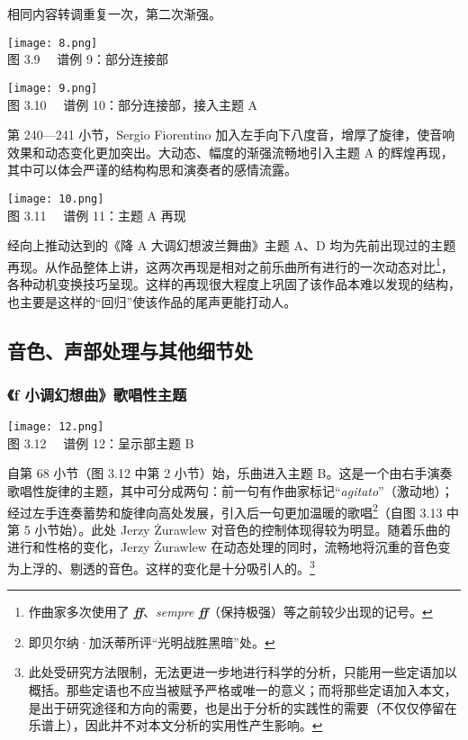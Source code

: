     相同内容转调重复一次，第二次渐强。

    \begin{center}
    \texttt{[image: 8.png]}\\
    \heiti \fontsize{10.5}{12.6}\selectfont 图 3.9 \ \ 谱例 9：部分连接部
    \end{center}
    \begin{center}
    \texttt{[image: 9.png]}\\
    \heiti \fontsize{10.5}{12.6}\selectfont 图 3.10 \ \ 谱例 10：部分连接部，接入主题 A
    \end{center}

    第 240—241 小节，Sergio Fiorentino 加入左手向下八度音，增厚了旋律，使音响效果和动态变化更加突出。大动态、幅度的渐强流畅地引入主题 A 的辉煌再现，其中可以体会严谨的结构构思和演奏者的感情流露。

    \begin{center}
    \texttt{[image: 10.png]}\\
    \heiti \fontsize{10.5}{12.6}\selectfont 图 3.11 \ \ 谱例 11：主题 A 再现
    \end{center}

    经向上推动达到的《降 A 大调幻想波兰舞曲》主题 A、D 均为先前出现过的主题再现。从作品整体上讲，这两次再现是相对之前乐曲所有进行的一次动态对比\footnote{作曲家多次使用了 \textit{\textbf{ff}}、\textit{sempre \textbf{ff}}（保持极强）等之前较少出现的记号。}，各种动机变换技巧呈现。这样的再现很大程度上巩固了该作品本难以发现的结构，也主要是这样的“回归”使该作品的尾声更能打动人。



    \subsection{\heiti \fontsize{15}{18}\selectfont 音色、声部处理与其他细节处}

    \subsubsection{\heiti \fontsize{14}{16.8}\selectfont 《f 小调幻想曲》歌唱性主题}

    \begin{center}
    \texttt{[image: 12.png]}\\
    \heiti \fontsize{10.5}{12.6}\selectfont 图 3.12 \ \ 谱例 12：呈示部主题 B
    \end{center}

    自第 68 小节（图 3.12 中第 2 小节）始，乐曲进入主题 B。这是一个由右手演奏歌唱性旋律的主题，其中可分成两句：前一句有作曲家标记“\textit{agitato}”（激动地）；经过左手连奏蓄势和旋律向高处发展，引入后一句更加温暖的歌唱\footnote{即贝尔纳·加沃蒂所评“光明战胜黑暗”处。}（自图 3.13 中第 5 小节始）。此处 Jerzy Żurawlew 对音色的控制体现得较为明显。随着乐曲的进行和性格的变化，Jerzy Żurawlew 在动态处理的同时，流畅地将沉重的音色变为上浮的、剔透的音色。这样的变化是十分吸引人的。\footnote{此处受研究方法限制，无法更进一步地进行科学的分析，只能用一些定语加以概括。那些定语也不应当被赋予严格或唯一的意义；而将那些定语加入本文，是出于研究途径和方向的需要，也是出于分析的实践性的需要（不仅仅停留在乐谱上），因此并不对本文分析的实用性产生影响。}

